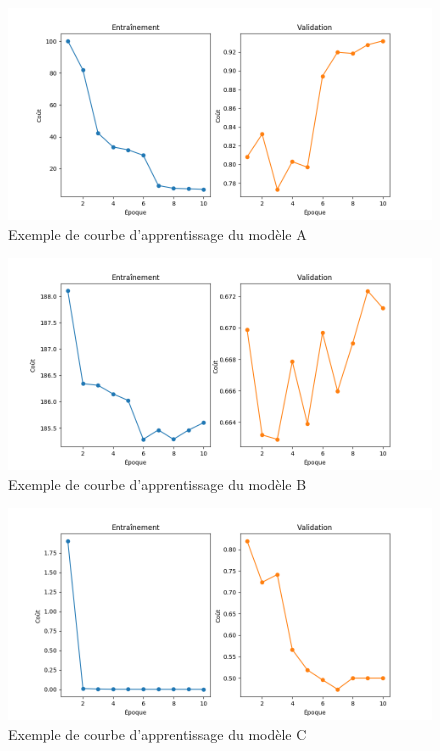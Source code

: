     \begin{figure}[H]
        \centering
        \includegraphics[width=16cm]{images/learning_curves_a.png}
        \caption{Exemple de courbe d'apprentissage du modèle A}
        \label{fig:learning_curves_a}
    \end{figure}

    \begin{figure}[H]
        \centering
        \includegraphics[width=16cm]{images/learning_curves_b.png}
        \caption{Exemple de courbe d'apprentissage du modèle B}
        \label{fig:learning_curves_b}
    \end{figure}

    \begin{figure}[H]
        \centering
        \includegraphics[width=16cm]{images/learning_curves_c.png}
        \caption{Exemple de courbe d'apprentissage du modèle C}
        \label{fig:learning_curves_c}
    \end{figure}

